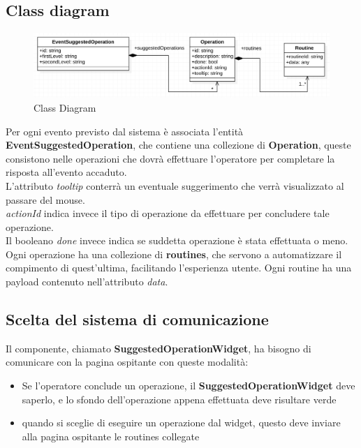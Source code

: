 \pagebreak
\subsection{Class diagram}

\begin{figure}[H]
    \centering
    \includegraphics[width=140mm]{img/class_diagram}
    \caption{Class Diagram}
  \end{figure}

Per ogni evento previsto dal sistema è associata l'entità \textbf{EventSuggestedOperation}, che contiene una collezione
di \textbf{Operation}, queste consistono nelle operazioni che dovrà effettuare l'operatore per completare la risposta 
all'evento accaduto. \\L'attributo \emph{tooltip} conterrà un eventuale suggerimento che verrà visualizzato al passare del 
mouse. \\ \emph{actionId} indica invece il tipo di operazione da effettuare per concludere tale operazione. \\Il booleano \emph{done} invece indica se suddetta 
operazione è stata effettuata o meno.\\Ogni operazione ha una collezione di \textbf{routines}, che servono a automatizzare il compimento 
di quest'ultima, facilitando l'esperienza utente. Ogni routine ha una payload contenuto nell'attributo \emph{data}.


\subsection{Scelta del sistema di comunicazione}
Il componente, chiamato \textbf{SuggestedOperationWidget}, ha bisogno di comunicare con la pagina ospitante con queste modalità:
\begin{itemize}
    \item Se l'operatore conclude un operazione, il \textbf{SuggestedOperationWidget} deve saperlo, e lo sfondo dell'operazione 
    appena effettuata deve risultare verde
    \item quando si sceglie di eseguire un operazione dal widget, questo deve inviare alla pagina ospitante le routines collegate
\end{itemize}

